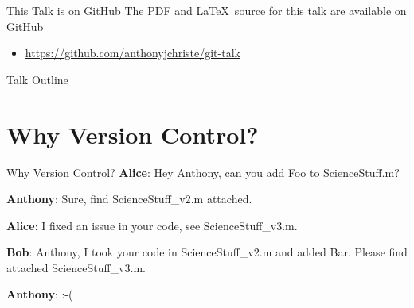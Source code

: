 \documentclass{beamer}
\begin{document}
    \begin{frame}{This Talk is on GitHub}
        The PDF and \LaTeX~source for this talk are available on GitHub
        \begin{itemize}
            \item \url{https://github.com/anthonyjchriste/git-talk}
        \end{itemize}
    \end{frame}

    \begin{frame}{Talk Outline}
        \tableofcontents
    \end{frame}

    \section{Why Version Control?}\label{sec:why-version-control?}
    \begin{frame}{Why Version Control?}
        \textbf{Alice}: Hey Anthony, can you add Foo to ScienceStuff.m?

        \textbf{Anthony}: Sure, find ScienceStuff\_v2.m attached.

        \textbf{Alice}: I fixed an issue in your code, see ScienceStuff\_v3.m.

        \textbf{Bob}: Anthony, I took your code in ScienceStuff\_v2.m and added Bar. Please find attached ScienceStuff\_v3.m.

        \textbf{Anthony}: :-(
    \end{frame}
\end{document}
